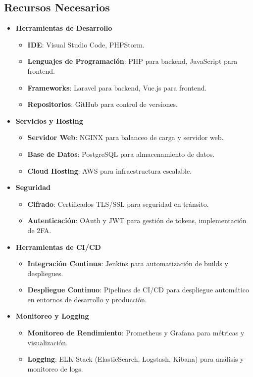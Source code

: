 \subsection{Recursos Necesarios}

\begin{itemize}
    \item \textbf{Herramientas de Desarrollo}
          \begin{itemize}
              \item \textbf{IDE}: Visual Studio Code, PHPStorm.
              \item \textbf{Lenguajes de Programación}: PHP para backend, JavaScript para frontend.
              \item \textbf{Frameworks}: Laravel para backend, Vue.js para frontend.
              \item \textbf{Repositorios}: GitHub para control de versiones.
          \end{itemize}

    \item \textbf{Servicios y Hosting}
          \begin{itemize}
              \item \textbf{Servidor Web}: NGINX para balanceo de carga y servidor web.
              \item \textbf{Base de Datos}: PostgreSQL para almacenamiento de datos.
              \item \textbf{Cloud Hosting}: AWS para infraestructura escalable.
          \end{itemize}

    \item \textbf{Seguridad}
          \begin{itemize}
              \item \textbf{Cifrado}: Certificados TLS/SSL para seguridad en tránsito.
              \item \textbf{Autenticación}: OAuth y JWT para gestión de tokens, implementación de 2FA.
          \end{itemize}

    \item \textbf{Herramientas de CI/CD}
          \begin{itemize}
              \item \textbf{Integración Continua}: Jenkins para automatización de builds y despliegues.
              \item \textbf{Despliegue Continuo}: Pipelines de CI/CD para despliegue automático en entornos de desarrollo y producción.
          \end{itemize}

    \item \textbf{Monitoreo y Logging}
          \begin{itemize}
              \item \textbf{Monitoreo de Rendimiento}: Prometheus y Grafana para métricas y visualización.
              \item \textbf{Logging}: ELK Stack (ElasticSearch, Logstash, Kibana) para análisis y monitoreo de logs.
          \end{itemize}
\end{itemize}


